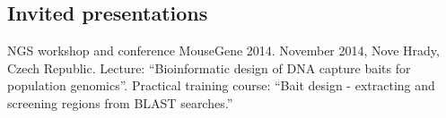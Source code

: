 \documentclass[10pt,a4paper]{article}
\renewenvironment{itemize}{
  \begin{list}{}{
    \setlength{\leftmargin}{2.5em}
    \setlength{\itemsep}{0.25em}
    \setlength{\parskip}{0pt}
    \setlength{\parsep}{0.25em}
  }
}{
  \end{list}
}
\begin{document}
%



\subsection*{Invited presentations}

\begin{itemize}

\item NGS workshop and conference MouseGene 2014. November 2014, Nove
  Hrady, Czech Republic. Lecture: ``Bioinformatic design of DNA
  capture baits for population genomics''. Practical training course:
  ``Bait design - extracting and screening regions from BLAST
  searches.''

\end{itemize}





  
\end{document}
